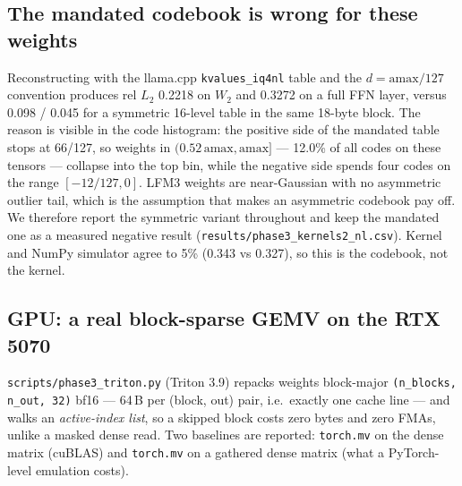 \documentclass[11pt]{article}
\newcommand{\wtwo}{\ensuremath{W_{2}}}
\newcommand{\code}[1]{\texttt{\small #1}}
\begin{document}
\subsection{The mandated codebook is wrong for these weights}\label{sec:code}
Reconstructing with the llama.cpp \code{kvalues\_iq4nl} table and the $d{=}\mathrm{amax}/127$
convention produces rel $L_2$ 0.2218 on \wtwo{} and 0.3272 on a full FFN layer, versus
0.098 / 0.045 for a symmetric 16-level table in the same 18-byte block. The reason is
visible in the code histogram: the positive side of the mandated table stops at 66/127, so
weights in $(0.52\,\mathrm{amax},\mathrm{amax}]$ --- 12.0\% of all codes on these
tensors --- collapse into the top bin, while the negative side spends four codes on the
range $[-12/127,0]$. LFM3 weights are near-Gaussian with no asymmetric outlier tail, which
is the assumption that makes an asymmetric codebook pay off. We therefore report the
symmetric variant throughout and keep the mandated one as a measured negative result
(\code{results/phase3\_kernels2\_nl.csv}). Kernel and NumPy simulator agree to 5\%
(0.343 vs 0.327), so this is the codebook, not the kernel.

\subsection{GPU: a real block-sparse GEMV on the RTX 5070}\label{sec:gpu}
\code{scripts/phase3\_triton.py} (Triton 3.9) repacks weights block-major
\code{(n\_blocks, n\_out, 32)} bf16 --- 64\,B per (block, out) pair, i.e.\ exactly one
cache line --- and walks an \emph{active-index list}, so a skipped block costs zero bytes
and zero FMAs, unlike a masked dense read. Two baselines are reported: \code{torch.mv} on
the dense matrix (cuBLAS) and \code{torch.mv} on a gathered dense matrix (what a
PyTorch-level emulation costs).

\begin{table}[h]\centering\small

\caption{Decode-shaped block-sparse GEMV on the RTX 5070 (bf16, $\tau$ from real layer-0
activations, median of 3$\times$200 launches, clock-warmed before each row). Sparsity
helps monotonically, and the block-major gather is exact (rel $L_2=0$).}
\end{table}
\end{document}
